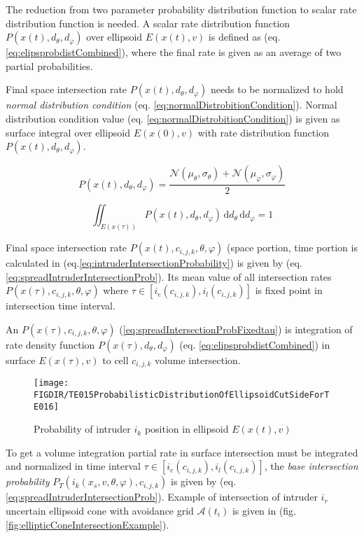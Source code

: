 The reduction from two parameter probability distribution function to scalar rate distribution function is needed. A scalar rate distribution  function $P({x}(t),d_\theta,d_\varphi)$ over ellipsoid $E({x}(t),{v})$ is defined as (eq.\ref{eq:elipsprobdistCombined}), where the final rate is given as an average of two partial probabilities. 

Final space intersection rate $P({x}(t),d_\theta,d_\varphi)$ needs to be normalized to hold \emph{normal distribution condition} (eq. \ref{eq:normalDistrobitionCondition}). Normal distribution condition value (eq. \ref{eq:normalDistrobitionCondition}) is given as surface integral over ellipsoid $E({x}(0),{v})$ with rate distribution function $P({x}(t),d_\theta,d_\varphi)$.

\begin{equation}\label{eq:elipsprobdistCombined}
    P({x}(t),d_\theta,d_\varphi) = \frac{\mathscr{N}(\mu_\theta,\sigma_\theta)+\mathscr{N}(\mu_\varphi,\sigma_\varphi)}{2}
\end{equation}

\begin{equation}\label{eq:normalDistrobitionCondition}
    \iint_{E({x}(\tau))} P({x}(t),d_\theta,d_\varphi) \,\text{d}d_\theta\,\text{d}d_\varphi = 1
\end{equation}

\noindent Final space intersection rate  $P({x}(t),c_{i,j,k},\theta,\varphi)$  (space portion, time portion is calculated in (eq.\ref{eq:intruderIntersectionProbability}) is given by (eq. \ref{eq:spreadIntruderIntersectionProb}). Its mean value of all intersection rates $P({x}(\tau),c_{i,j,k},\theta,\varphi)$ where $\tau\in[i_e(c_{i,j,k}),i_l(c_{i,j,k})]$ is fixed point in intersection time interval.

An $P({x}(\tau),c_{i,j,k},\theta,\varphi)$ (\ref{eq:spreadIntersectionProbFixedtau}) is integration of rate density function $P({x}(\tau),d_\theta,d_\varphi)$ (eq. \ref{eq:elipsprobdistCombined}) in surface $E({x}(\tau),{v})$ to cell $c_{i,j,k}$ volume intersection. 

\begin{figure}[H]
    \centering
    \texttt{[image: \\FIGDIR/TE015ProbabilisticDistributionOfEllipsoidCutSideForTE016]}
    \caption{Probability of intruder $i_k$ position in ellipsoid $E({x}(t),{v})$}
    \label{fig:intruderPassingProbability}
\end{figure}

\noindent To get a volume integration partial rate in surface intersection must be integrated and normalized in time interval $\tau\in[i_e(c_{i,j,k}),i_l(c_{i,j,k})]$, the \emph{base intersection probability} $P_T(i_k({x}_s,{v},\theta,\varphi),c_{i,j,k})$ is given by (eq. \ref{eq:spreadIntruderIntersectionProb}). Example of intersection of intruder $i_r$ uncertain ellipsoid cone with avoidance grid $\mathscr{A}(t_i)$ is given in (fig. \ref{fig:ellipticConeIntersectionExample}).

